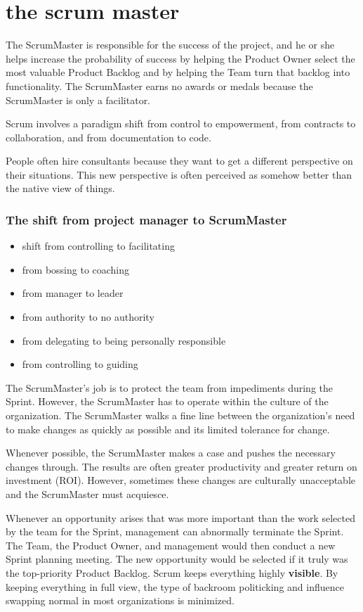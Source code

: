 \pagebreak
\chapter{the scrum master}
\label{sec:the_scrum_master}

The ScrumMaster is responsible for the success of the project, and he or she helps increase the probability of success by helping the Product Owner select the most valuable Product Backlog and by helping the Team turn that backlog into functionality. The ScrumMaster earns no awards or medals because the ScrumMaster is only a facilitator. 

Scrum involves a paradigm shift from control to empowerment, from contracts to collaboration, and from documentation to code.

People often hire consultants because they want to get a different perspective on their situations. This new perspective is often perceived as somehow better than the native view of things.


\subsection*{The shift from project manager to ScrumMaster}
\begin{itemize}
  \item shift from controlling to facilitating
  \item from bossing to coaching
  \item from manager to leader
  \item from authority to no authority
  \item from delegating to being personally responsible
  \item from controlling to guiding
\end{itemize}

The ScrumMaster’s job is to protect the team from impediments during the Sprint. However, the ScrumMaster has to operate within the culture of the organization. The ScrumMaster walks a fine line between the organization’s need to make changes as quickly as possible and its limited tolerance for change. 

Whenever possible, the ScrumMaster makes a  case and pushes the necessary changes through. The results are often greater productivity and greater return on investment (ROI). However, sometimes these changes are culturally unacceptable and the ScrumMaster must acquiesce.

Whenever an opportunity arises that was more important than the work selected by the team for the Sprint, management can abnormally terminate the Sprint. The Team, the Product Owner, and management would then conduct a new Sprint planning meeting. The new opportunity would be selected if it truly was the top-priority Product Backlog. Scrum keeps everything highly \textbf{visible}. By keeping everything in full view, the type of backroom politicking and influence swapping normal in most organizations is minimized.


